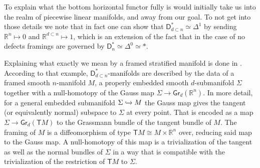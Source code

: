 \documentclass[../text]{subfiles}
\begin{document}
\begin{remark}
    To explain what the bottom horizontal functor fully is would initially take us into the realm of piecewise linear manifolds, and away from our goal. To not get into those details we note that in fact one can show that $\mathsf{D}_{d \subset n}^* \simeq \Delta^1$ by sending $\mathbb{R}^n \mapsto 0$ and $\mathbb{R}^{d \subset n} \mapsto 1$, which is an extension of the fact that in the case of no defects framings are governed by $ \mathsf{D}_n^* \simeq \Delta^0 \simeq *$.

    Explaining what exactly we mean by a framed stratified manifold is done in \cite[Example 5.2.12]{aft_localstrut}. According to that example, $\mathsf{D}_{d \subset n}^*$-manifolds are described by the data of a framed smooth $n$-manifold $M$, a properly embedded smooth $d$-submanifold $\Sigma$ together with a null-homotopy of the Gauss map $\Sigma \rightarrow \mathsf{Gr}_d(\mathbb{R}^n)$. In more detail, for a general embedded submanifold $\Sigma \xhookrightarrow{} M$ the Gauss map gives the tangent (or equivalently normal) subspace to $\Sigma$ at every point. That is encoded as a map $\Sigma \rightarrow \mathsf{Gr}_d(\mathsf{T}M)$ to the Grassmann bundle of the tangent bundle of $M$. The framing of $M$ is a diffeomorphism of type $\mathsf{T}M\cong M\times\mathbb{R}^n$ over, reducing said map to the Gauss map. A null-homotopy of this map is a trivialization of the tangent as well as the normal bundles of $\Sigma$ in a way that is compatible with the trivialization of the restriction of $\mathsf{T}M$ to $\Sigma$.
\end{remark}
\end{document}
